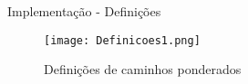 \begin{frame}{Implementação - Definições}
    \begin{figure}[htbp]
        \centering
        \texttt{[image: Definicoes1.png]}
        \caption{Definições de caminhos ponderados}
    \end{figure}
\end{frame}